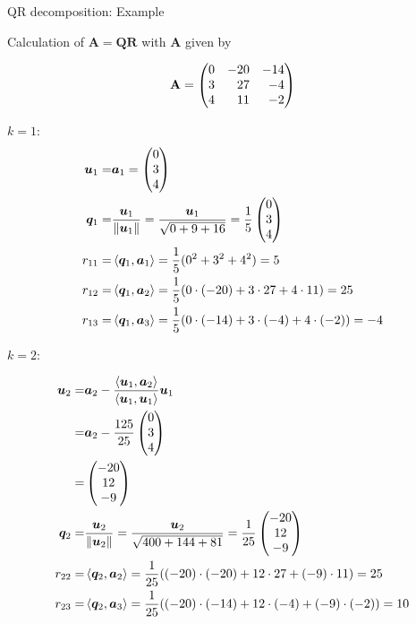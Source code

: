 \documentclass[11pt,compress,t,notes=noshow, xcolor=table]{beamer}
\begin{document}
\begin{vbframe}{QR decomposition: Example}

Calculation of $\bm{A} = \bm{Q}\bm{R}$ with $\bm{A}$ given by

\begin{footnotesize}
$$
\Amat = \begin{pmatrix*}[r]
0 & -20 & -14 \\
3 & 27 & -4 \\
4 & 11 & -2 \end{pmatrix*}
$$
\end{footnotesize}

\begin{footnotesize}
$k = 1$:
\vspace*{-0.5cm}
\begin{align*}
  \bm{u}_1 =& \bm{a}_1 = \begin{pmatrix} 0 \\ 3 \\ 4 \end{pmatrix} \\
  \bm{q}_1 =& \frac{\bm{u}_1}{\|\bm{u}_1\|} = \frac{\bm{u}_1}{\sqrt{0+9+16}}
           = \frac{1}{5} \begin{pmatrix} 0 \\ 3 \\ 4 \end{pmatrix} \\
  r_{11} =& \left\langle \bm{q}_1, \bm{a}_1 \right\rangle = \frac{1}{5} (0^2 + 3^2 + 4^2) = 5 \\
    r_{12} =& \left\langle \bm{q}_1, \bm{a}_2 \right\rangle = \frac{1}{5} (0 \cdot (-20) + 3 \cdot 27 + 4 \cdot 11) = 25 \\
        r_{13} =& \left\langle \bm{q}_1, \bm{a}_3 \right\rangle = \frac{1}{5} (0 \cdot (-14) + 3 \cdot (-4) + 4 \cdot (-2)) = -4
\end{align*}

\framebreak

$k = 2$:

\vspace*{-0.5cm}

\begin{align*}
  \bm{u}_2 =& \bm{a}_2 - \frac{\langle \bm{u}_1, \bm{a}_2 \rangle}{\langle \bm{u}_1, \bm{u}_1 \rangle} \bm{u}_1 \\
           =& \bm{a}_2 - \frac{125}{25} \begin{pmatrix} 0 \\ 3 \\ 4 \end{pmatrix} \\
           =& \begin{pmatrix} -20 \\ 12 \\ -9 \end{pmatrix} \\
  \bm{q}_2 =& \frac{\bm{u}_2}{\|\bm{u}_2\|} = \frac{\bm{u}_2}{\sqrt{400+144+81}}
           = \frac{1}{25} \begin{pmatrix} -20 \\ 12 \\ -9 \end{pmatrix} \\
               r_{22} =& \left\langle \bm{q}_2, \bm{a}_2 \right\rangle = \frac{1}{25} ((-20) \cdot (-20) + 12 \cdot 27 + (-9) \cdot 11) = 25 \\
           r_{23} =& \left\langle \bm{q}_2, \bm{a}_3 \right\rangle = \frac{1}{25} ((-20) \cdot (-14) + 12 \cdot (-4) + (-9) \cdot (-2)) = 10
\end{align*}


\end{footnotesize}
\end{vbframe}
\end{document}

